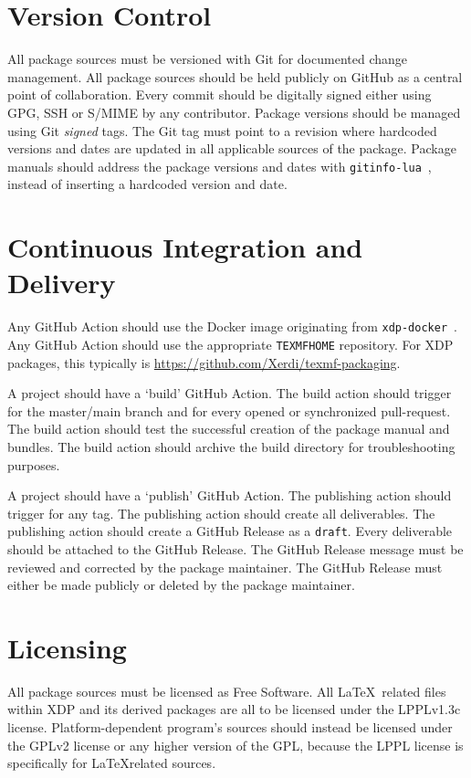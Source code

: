 \documentclass{xdpdoc}
\begin{document}
\begin{multicols}{2}
        \section{Version Control}\label{sec:git}

        All package sources must be versioned with Git for documented change management.
        All package sources should be held publicly on GitHub as a central point of collaboration.
        Every commit should be digitally signed either using GPG, SSH or S/MIME by any contributor.
        Package versions should be managed using Git \textit{signed} tags.
        The Git tag must point to a revision where hardcoded versions and dates are updated in all applicable sources of the package.
        Package manuals should address the package versions and dates with \texttt{gitinfo-lua}~\cite{gitinfo-lua}, instead of inserting a hardcoded version and date.


        \section{Continuous Integration and Delivery}

        Any GitHub Action should use the Docker image originating from \texttt{xdp-docker}~\cite{xdp-docker}.
        Any GitHub Action should use the appropriate \texttt{TEXMFHOME} repository.
        For XDP packages, this typically is \url{https://github.com/Xerdi/texmf-packaging}.

        A project should have a `build' GitHub Action.
        The build action should trigger for the master/main branch and for every opened or synchronized pull-request.
        The build action should test the successful creation of the package manual and bundles.
        The build action should archive the build directory for troubleshooting purposes.

        A project should have a `publish' GitHub Action.
        The publishing action should trigger for any tag.
        The publishing action should create all deliverables.
        The publishing action should create a GitHub Release as a \texttt{draft}.
        Every deliverable should be attached to the GitHub Release.
        The GitHub Release message must be reviewed and corrected by the package maintainer.
        The GitHub Release must either be made publicly or deleted by the package maintainer.


        \section{Licensing}

        All package sources must be licensed as Free Software.
        All \LaTeX\ related files within XDP and its derived packages are all to be licensed under the LPPLv1.3c license.
        Platform-dependent program's sources should instead be licensed under the GPLv2 license or any higher version of the GPL, because the LPPL license is specifically for \LaTeX related sources.

    \end{multicols}
\end{document}
